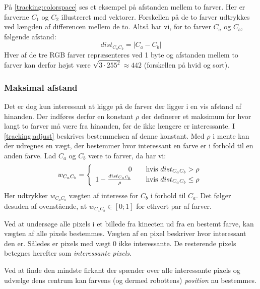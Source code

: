 På \cref{tracking:colorspace} ses et eksempel på afstanden mellem to farver.
Her er farverne $C_1$ og $C_2$ illustreret med vektorer.
Forskellen på de to farver udtrykkes ved længden af differencen mellem de to.
Altså har vi, for to farver $C_a$ og $C_b$, følgende afstand:
\begin{equation}
dist_{C_aC_b} = |C_a - C_b|
\end{equation}
Hver af de tre RGB farver repræsenteres ved 1 byte og afstanden mellem to farver kan derfor højst være $\sqrt{3 \cdot 255^2} \approx 442$ (forskellen på hvid og sort).

\subsubsection{Maksimal afstand}\label{tracking:maksimal_afstand}
Det er dog kun interessant at kigge på de farver der ligger i en vis afstand af hinanden.
Der indføres derfor en konstant $\rho$ der definerer et maksimum for hvor langt to farver må være fra hinanden, før de ikke længere er interessante.
I \cref{tracking:adjust} beskrives bestemmelsen af denne konstant.
Med $\rho$ i mente kan der udregnes en vægt, der bestemmer hvor interessant en farve er i forhold til en anden farve.
Lad $C_a$ og $C_b$ være to farver, da har vi:
\begin{equation}
w_{C_aC_b} = \left\{ 
  \begin{array}{r l}
        0 & \quad \text{hvis $dist_{C_aC_b} > \rho$} \\
       1 - \frac{dist_{C_aC_b}}{\rho} & \quad \text{hvis $dist_{C_aC_b} \leq \rho$}
  \end{array} \right.
\end{equation}
Her udtrykker $w_{C_aC_b}$ vægten af interesse for $C_b$ i forhold til $C_a$.
Det følger desuden af ovenstående, at $w_{C_aC_b} \in [0;1]$ for ethvert par af farver.

Ved at undersøge alle pixels i et billede fra kinecten ud fra en bestemt farve, kan vægten af alle pixels bestemmes.
Vægten af en pixel beskriver hvor interessant den er.
Således er pixels med vægt 0 ikke interessante.
De resterende pixels betegnes herefter som \emph{interessante pixels}.


Ved at finde den mindste firkant der spænder over alle interessante pixels og udvælge dens centrum kan farvens (og dermed robottens) \textit{position} nu bestemmes.

